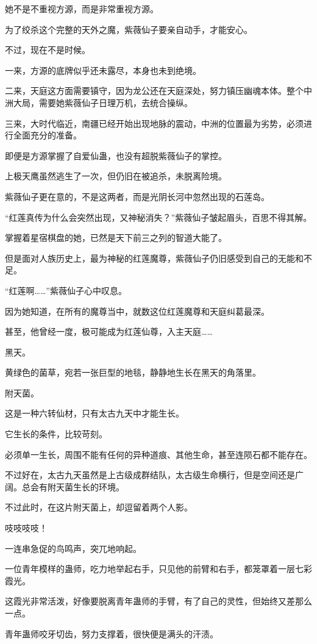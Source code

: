 \begin{this_body}
她不是不重视方源，而是非常重视方源。

为了绞杀这个完整的天外之魔，紫薇仙子要亲自动手，才能安心。

不过，现在不是时候。

一来，方源的底牌似乎还未露尽，本身也未到绝境。

二来，天庭这方面需要镇守，因为龙公还在天庭深处，努力镇压幽魂本体。整个中洲大局，需要她紫薇仙子日理万机，去统合操纵。

三来，大时代临近，南疆已经开始出现地脉的震动，中洲的位置最为劣势，必须进行全面充分的准备。

即便是方源掌握了自爱仙蛊，也没有超脱紫薇仙子的掌控。

上极天鹰虽然逃生了一次，但仍旧在被追杀，未脱离险境。

紫薇仙子更在意的，不是这两者，而是光阴长河中忽然出现的石莲岛。

“红莲真传为什么会突然出现，又神秘消失？”紫薇仙子皱起眉头，百思不得其解。

掌握着星宿棋盘的她，已然是天下前三之列的智道大能了。

但是面对人族历史上，最为神秘的红莲魔尊，紫薇仙子仍旧感受到自己的无能和不足。

“红莲啊……”紫薇仙子心中叹息。

因为她知道，在所有的魔尊当中，就数这位红莲魔尊和天庭纠葛最深。

甚至，他曾经一度，极可能成为红莲仙尊，入主天庭……

黑天。

黄绿色的菌草，宛若一张巨型的地毯，静静地生长在黑天的角落里。

附天菌。

这是一种六转仙材，只有太古九天中才能生长。

它生长的条件，比较苛刻。

必须单一生长，周围不能有任何的异种道痕、其他生命，甚至连陨石都不能存在。

不过好在，太古九天虽然是上古级成群结队，太古级生命横行，但是空间还是广阔。总会有附天菌生长的环境。

不过此时，在这片附天菌上，却逗留着两个人影。

吱吱吱吱！

一连串急促的鸟鸣声，突兀地响起。

一位青年模样的蛊师，吃力地举起右手，只见他的前臂和右手，都笼罩着一层七彩霞光。

这霞光非常活泼，好像要脱离青年蛊师的手臂，有了自己的灵性，但始终又差那么一点。

青年蛊师咬牙切齿，努力支撑着，很快便是满头的汗渍。


\end{this_body}
